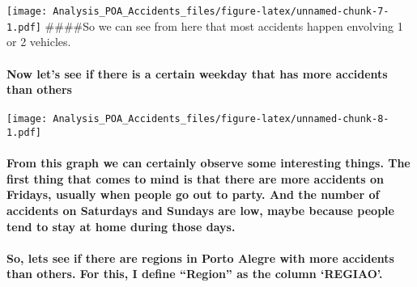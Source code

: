 \documentclass[]{article}
\newenvironment{Shaded}{\begin{snugshade}}{\end{snugshade}}
\newcommand{\KeywordTok}[1]{\textcolor[rgb]{0.13,0.29,0.53}{\textbf{#1}}}
\newcommand{\DataTypeTok}[1]{\textcolor[rgb]{0.13,0.29,0.53}{#1}}
\newcommand{\StringTok}[1]{\textcolor[rgb]{0.31,0.60,0.02}{#1}}
\newcommand{\OperatorTok}[1]{\textcolor[rgb]{0.81,0.36,0.00}{\textbf{#1}}}
\newcommand{\NormalTok}[1]{#1}
\let\oldparagraph\paragraph
\renewcommand{\paragraph}[1]{\oldparagraph{#1}\mbox{}}
\begin{document}
\texttt{[image: Analysis\_POA\_Accidents\_files/figure-latex/unnamed-chunk-7-1.pdf]}
\#\#\#\#So we can see from here that most accidents happen envolving 1
or 2 vehicles.

\paragraph{Now let's see if there is a certain weekday that has more
accidents than
others}\label{now-lets-see-if-there-is-a-certain-weekday-that-has-more-accidents-than-others}

\begin{Shaded}
\end{Shaded}

\texttt{[image: Analysis\_POA\_Accidents\_files/figure-latex/unnamed-chunk-8-1.pdf]}

\paragraph{From this graph we can certainly observe some interesting
things. The first thing that comes to mind is that there are more
accidents on Fridays, usually when people go out to party. And the
number of accidents on Saturdays and Sundays are low, maybe because
people tend to stay at home during those
days.}\label{from-this-graph-we-can-certainly-observe-some-interesting-things.-the-first-thing-that-comes-to-mind-is-that-there-are-more-accidents-on-fridays-usually-when-people-go-out-to-party.-and-the-number-of-accidents-on-saturdays-and-sundays-are-low-maybe-because-people-tend-to-stay-at-home-during-those-days.}

\paragraph{\texorpdfstring{So, lets see if there are regions in Porto
Alegre with more accidents than others. For this, I define ``Region'' as
the column
`REGIAO'.}{So, lets see if there are regions in Porto Alegre with more accidents than others. For this, I define Region as the column REGIAO.}}\label{so-lets-see-if-there-are-regions-in-porto-alegre-with-more-accidents-than-others.-for-this-i-define-region-as-the-column-regiao.}
\end{document}
